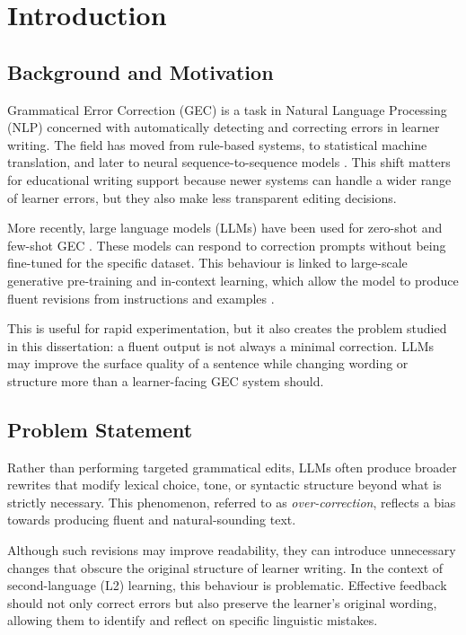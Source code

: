 \chapter{Introduction}

\section{Background and Motivation}

Grammatical Error Correction (GEC) is a task in Natural Language Processing (NLP) concerned with automatically detecting and correcting errors in learner writing. The field has moved from rule-based systems, to statistical machine translation, and later to neural sequence-to-sequence models \cite{10.1145/3474840}. This shift matters for educational writing support because newer systems can handle a wider range of learner errors, but they also make less transparent editing decisions.

More recently, large language models (LLMs) have been used for zero-shot and few-shot GEC \cite{loem2023exploringeffectivenessgpt3grammatical}. These models can respond to correction prompts without being fine-tuned for the specific dataset. This behaviour is linked to large-scale generative pre-training and in-context learning, which allow the model to produce fluent revisions from instructions and examples \cite{NEURIPS2020_1457c0d6}.

This is useful for rapid experimentation, but it also creates the problem studied in this dissertation: a fluent output is not always a minimal correction. LLMs may improve the surface quality of a sentence while changing wording or structure more than a learner-facing GEC system should.

\section{Problem Statement}

Rather than performing targeted grammatical edits, LLMs often produce broader rewrites that modify lexical choice, tone, or syntactic structure beyond what is strictly necessary. This phenomenon, referred to as \textit{over-correction}, reflects a bias towards producing fluent and natural-sounding text.

Although such revisions may improve readability, they can introduce unnecessary changes that obscure the original structure of learner writing. In the context of second-language (L2) learning, this behaviour is problematic. Effective feedback should not only correct errors but also preserve the learner's original wording, allowing them to identify and reflect on specific linguistic mistakes.

